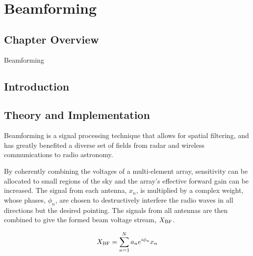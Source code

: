 \chapter{Beamforming}
\label{chapter:beamforming}




\section{Chapter Overview}

Beamforming

\section{Introduction}


  
  
\section{Theory and Implementation}
\label{sec:theory}

Beamforming is a signal processing technique that allows for 
spatial filtering, and has greatly benefited a diverse set of fields 
from radar and wireless communications to radio astronomy. %

By coherently combining the voltages of a multi-element array, 
sensitivity can be allocated to small regions of the sky and 
the array's effective forward gain can be increased. The signal 
from each antenna, $x_n$, is multiplied by a complex weight, whose 
phases, $\phi_n$, are chosen to destructively interfere the radio waves 
in all directions but the desired pointing. The signals 
from all antennas are then combined to give the formed beam 
voltage stream, $X_{\rm BF}$.

\begin{equation}
\label{eq-bf_sum}
X_{\rm BF} = \sum_{n=1}^N a_n e^{i\phi_n} x_n
\end{equation}

